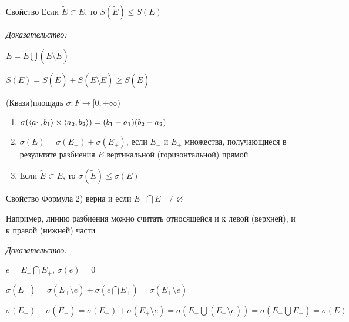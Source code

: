 \documentclass[12pt]{article}
\begin{document}
\begin{theo}{Свойство}
    Если $\tilde{E} \subset E$, то $S(\tilde{E}) \leq S(E)$
\end{theo}

\textit{Доказательство:}

$E = \tilde{E} \bigcup (E \setminus \tilde{E})$

$S(E) = S(\tilde{E}) + S(E \setminus \tilde{E}) \geq S(\tilde{E})$

\begin{defin}{(Квази)площадь}
    $\sigma : F \rightarrow [0, +\infty)$

    \begin{enumerate}
        \item $\sigma(\langle a_1, b_1 \rangle \times \langle a_2, b_2 \rangle) = (b_1 - a_1)(b_2 - a_2)$
        \item $\sigma(E) = \sigma(E_-) + \sigma(E_+)$, если $E_-$ и $E_+$ множества, получающиеся в результате разбиения $E$ вертикальной (горизонтальной) прямой
        \item Если $\tilde{E} \subset E$, то $\sigma(\tilde{E}) \leq \sigma(E)$
    \end{enumerate}
\end{defin}

\begin{Remark}{Свойство}
    Формула 2) верна и если $E_- \bigcap E_+ \neq \varnothing$

    Например, линию разбиения можно считать относящейся и к левой (верхней), и к правой (нижней) части
\end{Remark}

\textit{Доказательство:}

$e = E_- \bigcap E_+$, $\sigma(e) = 0$

$\sigma(E_+) = \sigma(E_+ \setminus e) + \sigma(e \bigcap E_+) = \sigma(E_+ \setminus e)$

$\sigma(E_-) + \sigma(E_+) = \sigma(E_-) + \sigma(E_+ \setminus e) = \sigma(E_- \bigcup (E_+ \setminus e)) = \sigma(E_- \bigcup E_+) = \sigma(E)$
\end{document}
